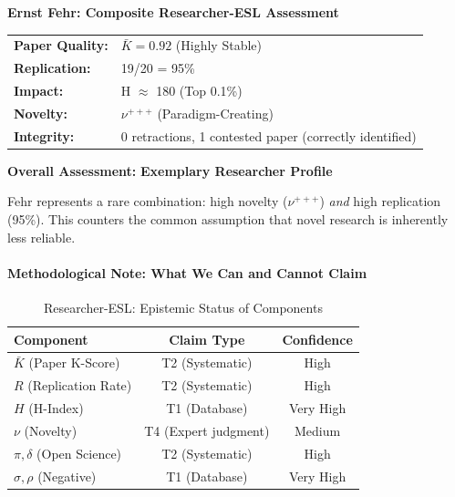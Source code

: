 \documentclass[11pt,a4paper]{article}
\begin{document}
\begin{resultbox}
\textbf{Ernst Fehr: Composite Researcher-ESL Assessment}

\begin{center}
\begin{tabular}{ll}
\textbf{Paper Quality:} & $\bar{K} = 0.92$ (Highly Stable) \\
\textbf{Replication:} & 19/20 = 95\% \\
\textbf{Impact:} & H $\approx$ 180 (Top 0.1\%) \\
\textbf{Novelty:} & $\nu^{+++}$ (Paradigm-Creating) \\
\textbf{Integrity:} & 0 retractions, 1 contested paper (correctly identified) \\
\end{tabular}
\end{center}

\textbf{Overall Assessment:} \textcolor{green!60!black}{\textbf{Exemplary Researcher Profile}}

Fehr represents a rare combination: high novelty ($\nu^{+++}$) \textit{and} high replication (95\%). This counters the common assumption that novel research is inherently less reliable.
\end{resultbox}

\paragraph{Methodological Note: What We Can and Cannot Claim}

\begin{table}[h]
\centering
\caption{Researcher-ESL: Epistemic Status of Components}
\begin{tabular}{lcc}
\toprule
\textbf{Component} & \textbf{Claim Type} & \textbf{Confidence} \\
\midrule
$\bar{K}$ (Paper K-Score) & T2 (Systematic) & High \\
$R$ (Replication Rate) & T2 (Systematic) & High \\
$H$ (H-Index) & T1 (Database) & Very High \\
$\nu$ (Novelty) & T4 (Expert judgment) & Medium \\
$\pi, \delta$ (Open Science) & T2 (Systematic) & High \\
$\sigma, \rho$ (Negative) & T1 (Database) & Very High \\
\bottomrule
\end{tabular}
\end{table}
\end{document}
